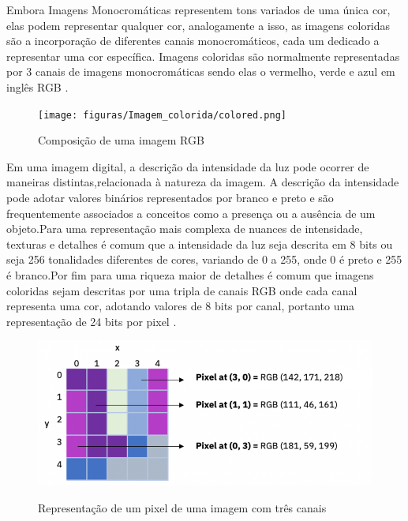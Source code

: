 Embora Imagens Monocromáticas representem tons variados de uma única cor, elas podem representar qualquer cor, analogamente a isso, as imagens coloridas são a incorporação de diferentes canais monocromáticos, cada um dedicado a representar uma cor específica. Imagens coloridas são normalmente representadas por 3 canais de imagens monocromáticas sendo elas o vermelho, verde e azul em inglês \ac{RGB} \cite{imagemIBM}.

\begin{figure}[!htb]
	\centering
    \caption{Composição de uma imagem RGB}
	\texttt{[image: figuras/Imagem\_colorida/colored.png]}
	\label{fig:Composicao de uma imagem RGB}
\end{figure}

Em uma imagem digital, a descrição da intensidade da luz pode ocorrer de maneiras distintas,relacionada à natureza da imagem. A descrição da intensidade pode adotar valores binários representados por branco e preto e são frequentemente associados a conceitos como a presença ou a ausência de um objeto.Para  uma representação mais complexa de nuances de intensidade, texturas e detalhes é comum  que a intensidade da luz seja descrita em 8 bits ou seja 256 tonalidades diferentes de cores, variando de 0 a 255, onde 0 é preto e 255 é branco.Por fim para uma riqueza maior de detalhes é comum que imagens coloridas sejam descritas por uma tripla de canais \ac{RGB}  onde cada canal representa uma  cor, adotando valores de 8 bits por canal, portanto uma representação de 24 bits por pixel \cite{imagemIBM}.

\begin{figure}[!htb]
	\centering
	\caption{Representação de um pixel de uma imagem com três canais}
	\includegraphics[scale=1]{figuras/processamento_imagem/pixel.png}
	\label{fig:Representacao do Pixel de uma imagem com 3 canais}
\end{figure}



